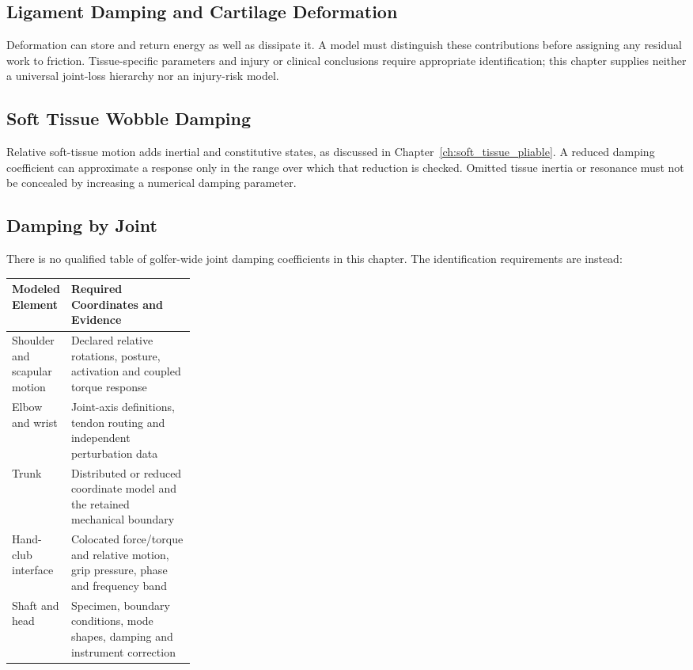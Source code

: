 \subsection{Ligament Damping and Cartilage
Deformation}\label{ligament-damping-and-cartilage-deformation}

Deformation can store and return energy as well as dissipate it. A model must distinguish these contributions before assigning any residual work to friction. Tissue-specific parameters and injury or clinical conclusions require appropriate identification; this chapter supplies neither a universal joint-loss hierarchy nor an injury-risk model.

\subsection{Soft Tissue Wobble
Damping}\label{soft-tissue-wobble-damping}

Relative soft-tissue motion adds inertial and constitutive states, as discussed in Chapter~\ref{ch:soft_tissue_pliable}. A reduced damping coefficient can approximate a response only in the range over which that reduction is checked. Omitted tissue inertia or resonance must not be concealed by increasing a numerical damping parameter.

\subsection{Damping by Joint}\label{sec-sources_damping}

There is no qualified table of golfer-wide joint damping coefficients in this chapter. The identification requirements are instead:

\begin{center}
\begin{tabularx}{\linewidth}{@{}>{\raggedright\arraybackslash}p{0.27\linewidth}X@{}}
\toprule
\textbf{Modeled Element} & \textbf{Required Coordinates and Evidence} \\
\midrule
Shoulder and scapular motion & Declared relative rotations, posture,
activation and coupled torque response \\
Elbow and wrist & Joint-axis definitions, tendon routing and independent perturbation data \\
Trunk & Distributed or reduced coordinate model and the retained
mechanical boundary \\
Hand-club interface & Colocated force/torque and relative motion, grip
pressure, phase and frequency band \\
Shaft and head & Specimen, boundary conditions, mode shapes, damping and
instrument correction \\
\bottomrule
\end{tabularx}
\end{center}

